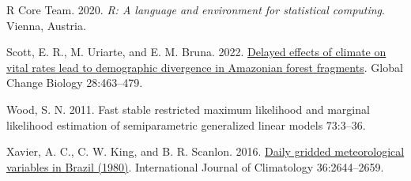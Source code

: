\documentclass[
]{article}
\newlength{\cslhangindent}
\newlength{\cslentryspacingunit} %
\newenvironment{CSLReferences}[2] %
 {%
  \setlength{\parindent}{0pt}
  \ifodd #1
  \let\oldpar\par
  \def\par{\hangindent=\cslhangindent\oldpar}
  \fi
  \setlength{\parskip}{#2\cslentryspacingunit}
 }%
 {}
\begin{document}
\begin{CSLReferences}{0}{0}
\leavevmode{}%
R Core Team. 2020. \emph{R: {A} language and environment for statistical
computing}. {Vienna, Austria}.

\leavevmode{}%
Scott, E. R., M. Uriarte, and E. M. Bruna. 2022.
\href{https://doi.org/10.1111/gcb.15900}{Delayed effects of climate on
vital rates lead to demographic divergence in Amazonian forest
fragments}. Global Change Biology 28:463--479.

\leavevmode{}%
Wood, S. N. 2011. Fast stable restricted maximum likelihood and marginal
likelihood estimation of semiparametric generalized linear models
73:3--36.

\leavevmode{}%
Xavier, A. C., C. W. King, and B. R. Scanlon. 2016.
\href{https://doi.org/10.1002/joc.4518}{Daily gridded meteorological
variables in {Brazil} (1980)}. International Journal of
Climatology 36:2644--2659.

\end{CSLReferences}
\end{document}
